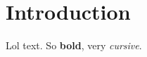 \documentclass[Main]{subfiles}
\begin{document}
\section{Introduction} %
	\label{sec:introduction}

	Lol text.
	So \textbf{bold}, very \emph{cursive}.

\end{document}
